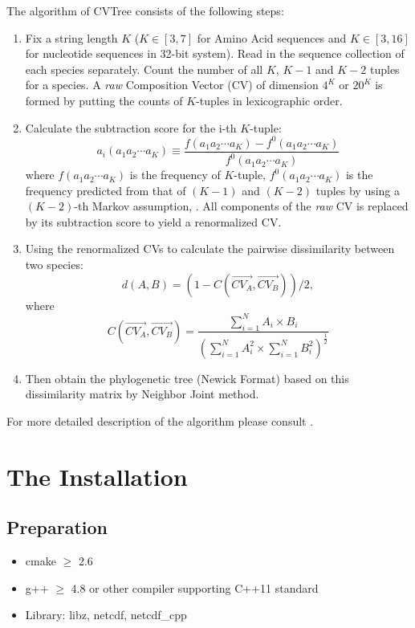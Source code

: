 \documentclass[a4paper,12pt]{article}
\begin{document}
The algorithm of CVTree consists of the following steps:
\begin{enumerate}\itemsep 0pt
\item Fix a string length $K$ ($K\in [3,7]$ for Amino Acid sequences and
  $K\in [3,16]$ for nucleotide sequences in 32-bit system). Read in the
  sequence collection of each species separately. Count the number of
  all $K$, $K-1$ and $K-2$ tuples for a species. A {\it raw} Composition
  Vector (CV) of dimension $4^K$ or ${20}^K$ is formed by putting the
  counts of $K$-tuples in lexicographic order.
  \item Calculate the subtraction score for the i-th $K$-tuple:
\begin{equation*}
  a_i(a_1a_2 \cdots a_K) \equiv \frac{f(a_1a_2 \cdots a_K) -
    f^0(a_1a_2 \cdots a_K)}{f^0(a_1a_2 \cdots a_K)}
\end{equation*}
where $f(a_1a_2 \cdots a_K)$ is the frequency of $K$-tuple, $f^0(a_1a_2
\cdots a_K)$ is the frequency predicted from that of $(K-1)$ and $(K-2)$
tuples by using a $(K-2)$-th Markov assumption, \cite{qwh04}.  All
components of the {\it raw} CV is replaced by its subtraction score to
yield a renormalized CV.
\item Using the renormalized CVs to calculate the pairwise dissimilarity
  between two species:
  $$d(A, B)=(1-C(\vec{CV_A},\vec{CV_B}))/2,$$
where
\begin{equation*}
  C(\vec{CV_A},\vec{CV_B})=\frac{\sum_{i=1}^NA_i \times
    B_i}{(\sum_{i=1}^NA_i^2 \times \sum_{i=1}^NB_i^2)^{\frac{1}{2}}}
\end{equation*}

\item Then obtain the phylogenetic tree (Newick Format) based on this
  dissimilarity matrix by Neighbor Joint method.
\end{enumerate}
For more detailed description of the algorithm please consult
\cite{qwh04}.



\section{The Installation}
\subsection{Preparation}
\begin{itemize}
	\item cmake $\geq$ 2.6
	\item g++ $\geq$ 4.8 or other compiler supporting C++11 standard
	\item Library: libz, netcdf, netcdf\_cpp
\end{itemize}
\end{document}
